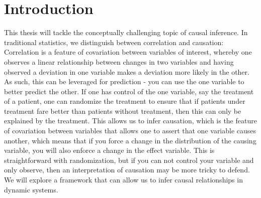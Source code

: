 \documentclass[11pt, a4paper]{memoir}
\theoremstyle{plain}
\theoremstyle{definition}
\begin{document}
\section{Introduction}
This thesis will tackle the conceptually challenging topic of causal inference. In traditional statistics, we distinguish between correlation and causation: Correlation is a feature of covariation between variables of interest, whereby one observes a linear relationship between changes in two variables and having observed a deviation in one variable makes a deviation more likely in the other. As such, this can be leveraged for prediction - you can use the one variable to better predict the other. If one has control of the one variable, say the treatment of a patient, one can randomize the treatment to ensure that if patients under treatment fare better than patients without treatment, then this can only be explained by the treatment. This allows us to infer causation, which is the feature of covariation between variables that allows one to assert that one variable causes another, which means that if you force a change in the distribution of the causing variable, you will also enforce a change in the effect variable. This is straightforward with randomization, but if you can not control your variable and only observe, then an interpretation of causation may be more tricky to defend. We will explore a framework that can allow us to infer causal relationships in dynamic systems.
\end{document}
